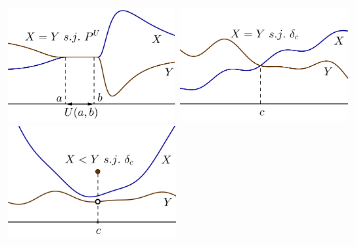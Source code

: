 \begin{figure}[h]
	\centering
	\includegraphics[height=3cm]{sj1}
	\hspace{0.4cm}
	\includegraphics[height=3cm]{sj2}
	\hspace{0.4cm}
	\includegraphics[height=3cm]{sj3}
	\label{fig:sj1}
\end{figure}

